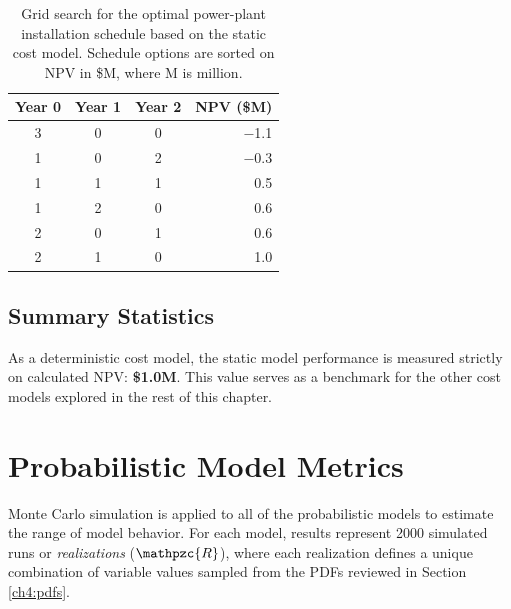\begin{table}[!htp]
\centering
\begin{tabular}{|c|c|c|r|}
\hline
\textbf{Year 0} & \textbf{Year 1} & \textbf{Year 2} & \textbf{NPV (\$M)} \\ \hline
3 & 0 & 0 & $\boldsymbol-$1.1 \\ \hline
1 & 0 & 2 & $\boldsymbol-$0.3 \\ \hline
1 & 1 & 1 & 0.5 \\ \hline
1 & 2 & 0 & 0.6 \\ \hline
2 & 0 & 1 & 0.6 \\ \hline
2 & 1 & 0 & 1.0 \\ \hline
\end{tabular}
\caption[Static model module installation schedule]{Grid search for the optimal power-plant installation schedule based on the static cost model. Schedule options are sorted on NPV in \$M, where M is million.}
\label{tab:static_optimization}
\end{table}

\subsection{Summary Statistics}\label{ch6:static_stats}

As a deterministic cost model, the static model performance is measured strictly on calculated NPV: \textbf{\$1.0M}. This value serves as a benchmark for the other cost models explored in the rest of this chapter.

\section{Probabilistic Model Metrics}\label{ch6:cost_model_metrics}

Monte Carlo simulation is applied to all of the probabilistic models to estimate the range of model behavior. For each model, results represent 2000 simulated runs or \textit{realizations} ($\mathpzc{R}$), where each realization defines a unique combination of variable values sampled from the PDFs reviewed in Section \ref{ch4:pdfs}. 

